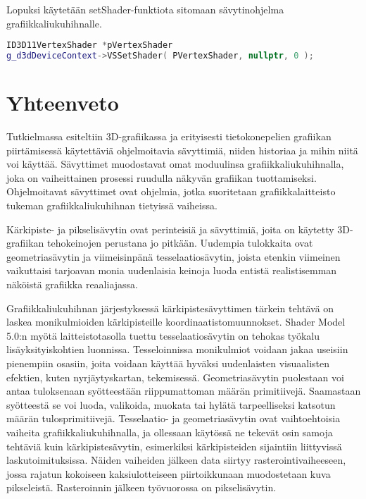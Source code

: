 \documentclass[finnish]{tktltiki2}
\theoremstyle{definition}
\theoremstyle{remark}
\begin{document}
Lopuksi käytetään setShader-funktiota sitomaan sävytinohjelma grafiikkaliukuhihnalle.

\lstset{breaklines=true}
\begin{lstlisting}[language=c++, basicstyle = \footnotesize]
ID3D11VertexShader *pVertexShader
g_d3dDeviceContext->VSSetShader( PVertexShader, nullptr, 0 );
\end{lstlisting}


\section{Yhteenveto}

Tutkielmassa esiteltiin 3D-grafiikassa ja erityisesti tietokonepelien grafiikan piirtämisessä käytettäviä ohjelmoitavia sävyttimiä, niiden historiaa ja mihin niitä voi käyttää. Sävyttimet muodostavat omat moduulinsa grafiikkaliukuhihnalla, joka on vaiheittainen prosessi ruudulla näkyvän grafiikan tuottamiseksi. Ohjelmoitavat sävyttimet ovat ohjelmia, jotka suoritetaan grafiikkalaitteisto tukeman grafiikkaliukuhihnan tietyissä vaiheissa.

Kärkipiste- ja pikselisävytin ovat perinteisiä ja sävyttimiä, joita on käytetty 3D-grafiikan tehokeinojen perustana jo pitkään. Uudempia tulokkaita ovat geometriasävytin ja viimeisinpänä tesselaatiosävytin, joista etenkin viimeinen vaikuttaisi tarjoavan monia uudenlaisia keinoja luoda entistä realistisemman näköistä grafiikka reaaliajassa.

Grafiikkaliukuhihnan järjestyksessä kärkipistesävyttimen tärkein tehtävä on laskea monikulmioiden kärkipisteille koordinaatistomuunnokset. Shader Model 5.0:n myötä laitteistotasolla tuettu tesselaatiosävytin on tehokas työkalu lisäyksityiskohtien luonnissa. Tesseloinnissa monikulmiot voidaan jakaa useisiin pienempiin osasiin, joita voidaan käyttää hyväksi uudenlaisten visuaalisten efektien, kuten nyrjäytyskartan, tekemisessä. Geometriasävytin puolestaan voi antaa tuloksenaan syötteestään riippumattoman määrän primitiivejä. Saamastaan syötteestä se voi luoda, valikoida, muokata tai hylätä tarpeelliseksi katsotun määrän tulosprimitiivejä. Tesselaatio- ja geometriasävytin ovat vaihtoehtoisia vaiheita grafiikkaliukuhihnalla, ja ollessaan käytössä ne tekevät osin samoja tehtäviä kuin kärkipistesävytin, esimerkiksi kärkipisteiden sijaintiin liittyvissä laskutoimituksissa. Näiden vaiheiden jälkeen data siirtyy rasterointivaiheeseen, jossa rajatun kokoiseen kaksiulotteiseen piirtoikkunaan muodostetaan kuva pikseleistä. Rasteroinnin jälkeen työvuorossa on pikselisävytin.
\end{document}

